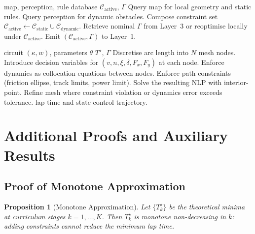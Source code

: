 \documentclass[11pt,twocolumn]{article}
\newtheorem{proposition}[theorem]{Proposition}
\theoremstyle{definition}
\theoremstyle{remark}
\newcommand{\cC}{\mathcal{C}}
\begin{document}
\begin{algorithm}[H]
\caption{Constraint manager (Layer~2)}
\label{alg:layer2}
\begin{algorithmic}[1]
\Require map, perception, rule database
\Ensure $\cC_{\mathrm{active}}$, $\Gamma$
\State Query map for local geometry and static rules.
\State Query perception for dynamic obstacles.
\State Compose constraint set $\cC_{\mathrm{active}} \leftarrow \cC_{\mathrm{static}} \cup \cC_{\mathrm{dynamic}}$.
\State Retrieve nominal $\Gamma$ from Layer~3 or reoptimise locally under $\cC_{\mathrm{active}}$.
\State Emit $(\cC_{\mathrm{active}}, \Gamma)$ to Layer~1.
\end{algorithmic}
\end{algorithm}

\begin{algorithm}[H]
\caption{Direct-transcription lap-time solver (sketch)}
\label{alg:transcription}
\begin{algorithmic}[1]
\Require circuit $(\kappa, w)$, parameters $\theta$
\Ensure $T^{\star}$, $\Gamma$
\State Discretise arc length into $N$ mesh nodes.
\State Introduce decision variables for $(v, n, \xi, \delta, F_x, F_y)$ at each node.
\State Enforce dynamics as collocation equations between nodes.
\State Enforce path constraints (friction ellipse, track limits, power limit).
\State Solve the resulting NLP with interior-point.
\State Refine mesh where constraint violation or dynamics error exceeds tolerance.
\State \Return lap time and state-control trajectory.
\end{algorithmic}
\end{algorithm}

\section{Additional Proofs and Auxiliary Results}
\label{app:additional}

\subsection{Proof of Monotone Approximation}

\begin{proposition}[Monotone Approximation]\label{prop:monotone-approx}
Let $\{T^{\star}_k\}$ be the theoretical minima at curriculum stages $k = 1, \ldots, K$. Then $T^{\star}_k$ is monotone non-decreasing in $k$: adding constraints cannot reduce the minimum lap time.
\end{proposition}
\end{document}
